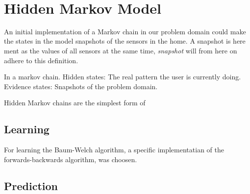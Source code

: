 ­\section{Hidden Markov Model}
An initial implementation of a Markov chain in our problem domain could make the states in the model snapshots of the sensors in the home. A snapshot is here ment as the values of all sensors at the same time, ­\emph{snapshot} will from here on adhere to this definition.

 In a markov chain.
Hidden states: The real pattern the user is currently doing.
Evidence states: Snapshots of the problem domain.

Hidden Markov chains are the simplest form of

\subsection{Learning}
For learning the Baum-Welch algorithm, a specific implementatian of the forwards-backwards algorithm, was choosen.

\subsection{Prediction}
